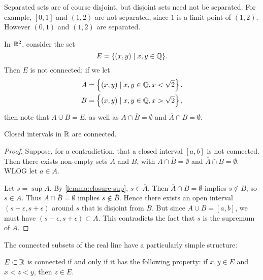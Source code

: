 \begin{remark}
Separated sets are of course disjoint, but disjoint sets need not be separated. For example, $[0,1]$ and $(1,2)$ are not separated, since $1$ is a limit point of $(1,2)$. However $(0,1)$ and $(1,2)$ are separated.
\end{remark}

\begin{example}
In $\mathbb R^2$, consider the set
\[E=\{(x,y)\mid x,y\in\mathbb Q\}.\]
Then $E$ is not connected; if we let
\begin{align*}
A&=\left\{(x,y)\mid x,y\in\mathbb Q,x<\sqrt{2}\right\},\\
B&=\left\{(x,y)\mid x,y\in\mathbb Q,x>\sqrt{2}\right\},
\end{align*}
then note that $A\cup B=E$, as well as $A\cap\overline{B}=\emptyset$ and $\overline{A}\cap B=\emptyset$.
\end{example}

\begin{lemma}\label{lemma:connected-closed-interval}
Closed intervals in $\mathbb R$ are connected.
\end{lemma}

\begin{proof}
Suppose, for a contradiction, that a closed interval $[a,b]$ is not connected. Then there exists non-empty sets $A$ and $B$, with $A\cap\overline{B}=\emptyset$ and $\overline{A}\cap B=\emptyset$. WLOG let $a\in A$.

Let $s=\sup A$. By \ref{lemma:closure-sup}, $s\in\overline{A}$. Then $\overline{A}\cap B=\emptyset$ implies $s\notin B$, so $s\in A$. Thus $A\cap\overline{B}=\emptyset$ implies $s\notin\overline{B}$. Hence there exists an open interval $(s-\epsilon,s+\epsilon)$ around $s$ that is disjoint from $B$. But since $A\cup B=[a,b]$, we must have $(s-\epsilon,s+\epsilon)\subset A$. This contradicts the fact that $s$ is the supremum of $A$. 
\end{proof}

The connected subsets of the real line have a particularly simple structure: 

\begin{lemma}\label{lemma:connected-interval-R}
$E\subset\mathbb R$ is connected if and only if it has the following property: if $x,y\in E$ and $x<z<y$, then $z\in E$.
\end{lemma}

